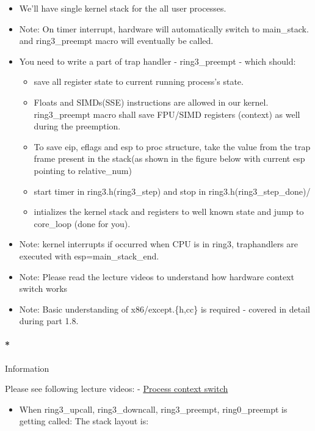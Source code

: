 \documentclass[]{article}
\providecommand{\tightlist}{%
  \setlength{\itemsep}{0pt}\setlength{\parskip}{0pt}}
\let\oldparagraph\paragraph
\renewcommand{\paragraph}[1]{\oldparagraph{#1}\mbox{}}
\begin{document}
\begin{itemize}
\tightlist
\item
  We'll have single kernel stack for the all user processes.
\item
  Note: On timer interrupt, hardware will automatically switch to
  main\_stack. and ring3\_preempt macro will eventually be called.
\item
  You need to write a part of trap handler - ring3\_preempt - which
  should:

  \begin{itemize}
  \tightlist
  \item
    save all register state to current running process's state.
  \item
    Floats and SIMDs(SSE) instructions are allowed in our kernel.
    ring3\_preempt macro shall save FPU/SIMD registers (context) as well
    during the preemption.
  \item
    To save eip, eflags and esp to proc structure, take the value from
    the trap frame present in the stack(as shown in the figure below
    with current esp pointing to relative\_num)
  \item
    start timer in ring3.h(ring3\_step) and stop in
    ring3.h(ring3\_step\_done)/
  \item
    intializes the kernel stack and registers to well known state and
    jump to core\_loop (done for you).
  \end{itemize}
\item
  Note: kernel interrupts if occurred when CPU is in ring3, traphandlers
  are executed with esp=main\_stack\_end.
\item
  Note: Please read the lecture videos to understand how hardware
  context switch works
\item
  Note: Basic understanding of x86/except.\{h,cc\} is required - covered
  in detail during part 1.8.
\end{itemize}

\paragraph*{Information}\label{information-10}

Please see following lecture videos: - \href{}{Process context switch}

\begin{itemize}
\tightlist
\item
  When ring3\_upcall, ring3\_downcall, ring3\_preempt, ring0\_preempt is
  getting called: The stack layout is:
\end{itemize}
\end{document}
